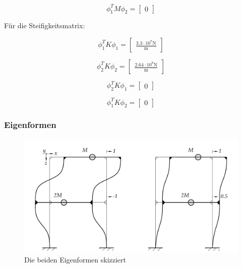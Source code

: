 \documentclass[
  letterpaper,
  DIV=11]{scrreprt}
\begin{document}
\begin{equation}\phi_{1}^{T} M \phi_{2} = \left[\begin{matrix}0\end{matrix}\right]\end{equation}

Für die Steifigkeitsmatrix:

\begin{equation}\phi_{1}^{T} K \phi_{1} = \left[\begin{matrix}\frac{3.3 \cdot 10^{7} \text{N}}{\text{m}}\end{matrix}\right]\end{equation}

\begin{equation}\phi_{2}^{T} K \phi_{2} = \left[\begin{matrix}\frac{2.64 \cdot 10^{8} \text{N}}{\text{m}}\end{matrix}\right]\end{equation}

\begin{equation}\phi_{2}^{T} K \phi_{1} = \left[\begin{matrix}0\end{matrix}\right]\end{equation}

\begin{equation}\phi_{1}^{T} K \phi_{2} = \left[\begin{matrix}0\end{matrix}\right]\end{equation}

\hypertarget{eigenformen-2}{%
\subsubsection{Eigenformen}\label{eigenformen-2}}

\begin{figure}[H]

{\centering \includegraphics{index_files/mediabag/bilder/aufgabe_mms_steif_eigenvektoren.pdf}

}

\caption{\label{fig-mms_antwort_eigenformen}Die beiden Eigenformen
skizziert}

\end{figure}
\end{document}
